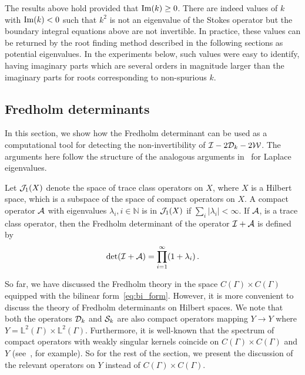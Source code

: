 {\color{red}
\begin{remark}
  The results above hold provided that ${\rm Im}(k) \geq 0$.
  There are indeed values of $k$ with ${\rm Im}(k) < 0$ such
  that $k^2$ is not an eigenvalue of the Stokes operator but
  the boundary integral equations above are not invertible.
  In practice, these values can be returned by the root finding
  method described in the following sections as potential
  eigenvalues. In the experiments below, such values were easy to
  identify, having imaginary parts which are several orders
  in magnitude larger than the imaginary parts for roots
  corresponding to non-spurious $k$.
\end{remark}}

\subsection{Fredholm determinants}
\label{sec:dets}
In this section, we show
how the Fredholm determinant can be used
as a computational tool for detecting the
non-invertibility of $\mathcal I - 2{\mathcal D}_{k} - 2{\mathcal W}$.
The arguments here follow the structure of the
analogous arguments in~\cite{zhao2015robust}
for Laplace eigenvalues.

Let ${\mathcal J}_{1}(X)$ denote the space of trace class operators 
on $X$, where $X$ is a Hilbert space, which is a
subspace of the space of compact operators on $X$.
A compact operator ${\mathcal A}$ with eigenvalues
$\lambda_{i}, i\in \mathbb{N}$ is in ${\mathcal J}_{1}(X)$ if
$\sum_{i} |\lambda_{i}| < \infty$.
If ${\mathcal A}$, is a trace class operator, then  
the Fredholm determinant of the operator $\mathcal I + {\mathcal A}$
is defined by
\begin{equation}
\text{det}(\mathcal I +{\mathcal A}) = \prod_{i=1}^{\infty} (1+\lambda_{i}) \, .
\end{equation}

So far, we have discussed the Fredholm theory in the space
$C(\Gamma)\times C(\Gamma)$ equipped with the bilinear form~\cref{eq:bi_form}.
However, it is more convenient to discuss the theory of Fredholm
determinants on Hilbert spaces. 
We note that both the operators ${\mathcal D}_{k}$ and ${\mathcal S}_{k}$ 
are also compact operators mapping $Y \to Y$
where $Y = \mathbb{L}^{2}(\Gamma) \times \mathbb{L}^{2}(\Gamma)$.
Furthermore, it is well-known that the spectrum of compact
operators with weakly singular kernels coincide on 
$C(\Gamma)\times C(\Gamma)$ and $Y$ (see~\cite{kress1989linear},
for example).
So for the rest of the section, we present the discussion of 
the relevant operators on $Y$ instead of $C(\Gamma)\times C(\Gamma)$.


